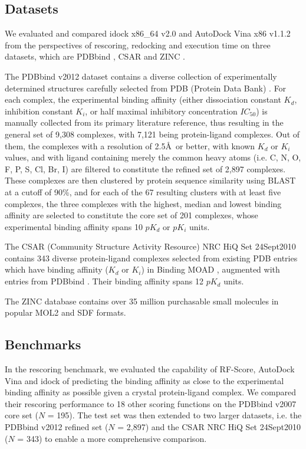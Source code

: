 \subsection{Datasets}

We evaluated and compared idock x86\_64 v2.0 and AutoDock Vina x86 v1.1.2 from the perspectives of rescoring, redocking and execution time on three datasets, which are PDBbind \citep{529,530}, CSAR \citep{857,960} and ZINC \citep{532,1178}.

The PDBbind v2012 dataset contains a diverse collection of experimentally determined structures carefully selected from PDB (Protein Data Bank) \citep{540,537}. For each complex, the experimental binding affinity (either dissociation constant $K_d$, inhibition constant $K_i$, or half maximal inhibitory concentration $IC_{50}$) is manually collected from its primary literature reference, thus resulting in the general set of 9,308 complexes, with 7,121 being protein-ligand complexes. Out of them, the complexes with a resolution of 2.5\AA\ or better, with known $K_d$ or $K_i$ values, and with ligand containing merely the common heavy atoms (i.e. C, N, O, F, P, S, Cl, Br, I) are filtered to constitute the refined set of 2,897 complexes. These complexes are then clustered by protein sequence similarity using BLAST at a cutoff of 90\%, and for each of the 67 resulting clusters with at least five complexes, the three complexes with the highest, median and lowest binding affinity are selected to constitute the core set of 201 complexes, whose experimental binding affinity spans 10 $pK_d$ or $pK_i$ units.

The CSAR (Community Structure Activity Resource) NRC HiQ Set 24Sept2010 contains 343 diverse protein-ligand complexes selected from existing PDB \citep{540,537} entries which have binding affinity ($K_d$ or $K_i$) in Binding MOAD \citep{517,518}, augmented with entries from PDBbind \citep{529,530}. Their binding affinity spans 12 $pK_d$ units.

The ZINC database contains over 35 million purchasable small molecules in popular MOL2 and SDF formats.

\subsection{Benchmarks}

In the rescoring benchmark, we evaluated the capability of RF-Score, AutoDock Vina and idock of predicting the binding affinity as close to the experimental binding affinity as possible given a crystal protein-ligand complex. We compared their rescoring performance to 18 other scoring functions on the PDBbind v2007 core set ($N$ = 195). The test set was then extended to two larger datasets, i.e. the PDBbind v2012 refined set ($N$ = 2,897) \citep{529,530} and the CSAR NRC HiQ Set 24Sept2010 ($N$ = 343) \citep{857,960} to enable a more comprehensive comparison.

